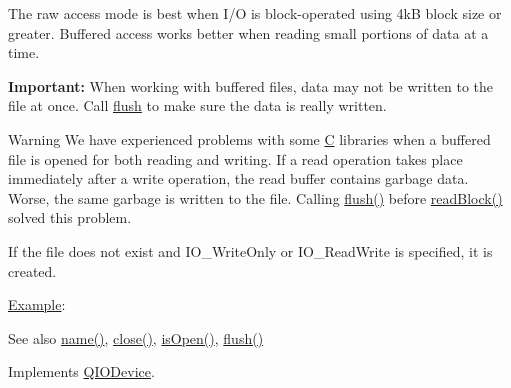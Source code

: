 The raw access mode is best when I/O is block-\/operated using 4kB block size or greater. Buffered access works better when reading small portions of data at a time.

{\bfseries{Important\+:}} When working with buffered files, data may not be written to the file at once. Call \mbox{\hyperlink{class_q_file_a6d450a55bc3a8145fd33a7ee08051830}{flush}} to make sure the data is really written.

\begin{DoxyWarning}{Warning}
We have experienced problems with some \mbox{\hyperlink{class_c}{C}} libraries when a buffered file is opened for both reading and writing. If a read operation takes place immediately after a write operation, the read buffer contains garbage data. Worse, the same garbage is written to the file. Calling \mbox{\hyperlink{class_q_file_a6d450a55bc3a8145fd33a7ee08051830}{flush()}} before \mbox{\hyperlink{class_q_file_ab9a42e65a2fcd51bae5f2a186ff5bee5}{read\+Block()}} solved this problem.
\end{DoxyWarning}
If the file does not exist and {\ttfamily I\+O\+\_\+\+Write\+Only} or {\ttfamily I\+O\+\_\+\+Read\+Write} is specified, it is created.

\mbox{\hyperlink{struct_example}{Example}}\+: 
\begin{DoxyCode}{0}
\end{DoxyCode}


\begin{DoxySeeAlso}{See also}
\mbox{\hyperlink{class_q_file_ad14b368c041b9e2d22bbd4428f859b29}{name()}}, \mbox{\hyperlink{class_q_file_ac0d8375a5ea7d4503545d7c68dcf58e1}{close()}}, \mbox{\hyperlink{class_q_i_o_device_a291d97cdb38c1cd261bfbaa67a9d3923}{is\+Open()}}, \mbox{\hyperlink{class_q_file_a6d450a55bc3a8145fd33a7ee08051830}{flush()}} 
\end{DoxySeeAlso}


Implements \mbox{\hyperlink{class_q_i_o_device_ae4046ae7bf4d4cee1010239973314e42}{Q\+I\+O\+Device}}.

\mbox{\label{class_q_file_af97fe0dd1ca0aa8b0a0c72b726a32860}} 
